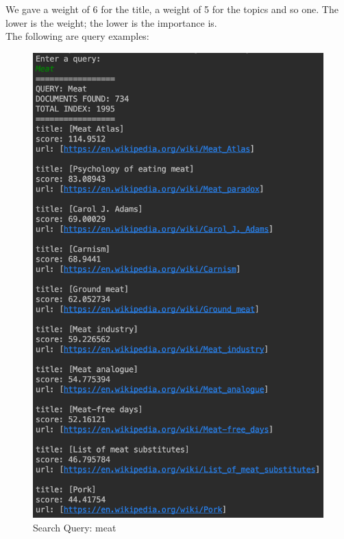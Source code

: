 \documentclass[a4paper]{article}
\begin{document}
We gave a weight of 6 for the title, a weight of 5 for the topics and so one. The lower is the weight; the lower is the importance is.\\

The following are query examples:

\begin{figure}[H]
  
  \begin{minipage}[b]{0.4\textwidth}
    \includegraphics[width=\textwidth]{imgs/meat}
    \caption{Search Query: meat}
    \label{fig:meat}
  \end{minipage}
  \hfill
  \begin{minipage}[b]{0.4\textwidth}

\end{minipage}
\end{figure}
\end{document}
